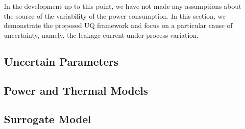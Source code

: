 In the development up to this point, we have not made any assumptions about the source of the variability of the power consumption. In this section, we demonstrate the proposed UQ framework and focus on a particular cause of uncertainty, namely, the leakage current under process variation.

\subsection{Uncertain Parameters} 


\subsection{Power and Thermal Models}  


\subsection{Surrogate Model} 

